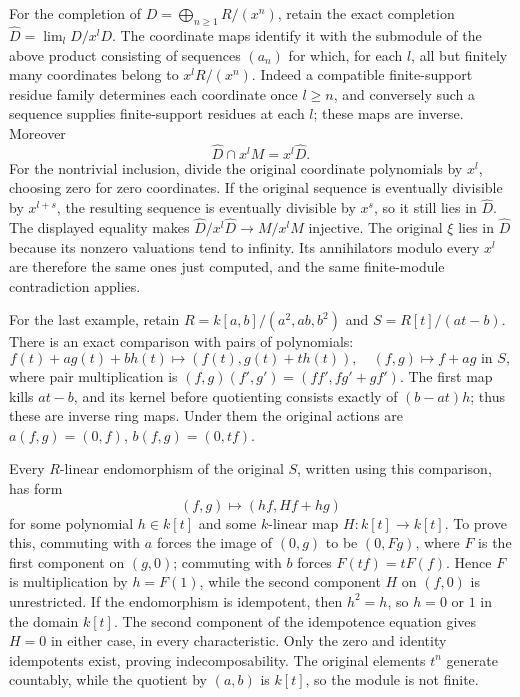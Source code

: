 For the completion of \(D=\bigoplus_{n\geq1}R/(x^n)\), retain the exact completion \(\widehat D=\lim_l D/x^lD\). The coordinate maps identify it with the submodule of the above product consisting of sequences \((a_n)\) for which, for each \(l\), all but finitely many coordinates belong to \(x^lR/(x^n)\). Indeed a compatible finite-support residue family determines each coordinate once \(l\geq n\), and conversely such a sequence supplies finite-support residues at each \(l\); these maps are inverse. Moreover \[
\widehat D\cap x^lM=x^l\widehat D.
\] For the nontrivial inclusion, divide the original coordinate polynomials by \(x^l\), choosing zero for zero coordinates. If the original sequence is eventually divisible by \(x^{l+s}\), the resulting sequence is eventually divisible by \(x^s\), so it still lies in \(\widehat D\). The displayed equality makes \(\widehat D/x^l\widehat D\to M/x^lM\) injective. The original \(\xi\) lies in \(\widehat D\) because its nonzero valuations tend to infinity. Its annihilators modulo every \(x^l\) are therefore the same ones just computed, and the same finite-module contradiction applies.

For the last example, retain \(R=k[a,b]/(a^2,ab,b^2)\) and \(S=R[t]/(at-b)\). There is an exact comparison with pairs of polynomials: \[
f(t)+a g(t)+b h(t)\longmapsto(f(t),g(t)+t h(t)),
\quad (f,g)\longmapsto f+a g\text{ in }S,
\] where pair multiplication is \((f,g)(f',g')=(ff',fg'+gf')\). The first map kills \(at-b\), and its kernel before quotienting consists exactly of \((b-at)h\); thus these are inverse ring maps. Under them the original actions are \(a(f,g)=(0,f)\), \(b(f,g)=(0,tf)\).

Every \(R\)-linear endomorphism of the original \(S\), written using this comparison, has form \[
(f,g)\longmapsto(hf,Hf+hg)
\] for some polynomial \(h\in k[t]\) and some \(k\)-linear map \(H:k[t]\to k[t]\). To prove this, commuting with \(a\) forces the image of \((0,g)\) to be \((0,Fg)\), where \(F\) is the first component on \((g,0)\); commuting with \(b\) forces \(F(tf)=tF(f)\). Hence \(F\) is multiplication by \(h=F(1)\), while the second component \(H\) on \((f,0)\) is unrestricted. If the endomorphism is idempotent, then \(h^2=h\), so \(h=0\) or \(1\) in the domain \(k[t]\). The second component of the idempotence equation gives \(H=0\) in either case, in every characteristic. Only the zero and identity idempotents exist, proving indecomposability. The original elements \(t^n\) generate countably, while the quotient by \((a,b)\) is \(k[t]\), so the module is not finite.


